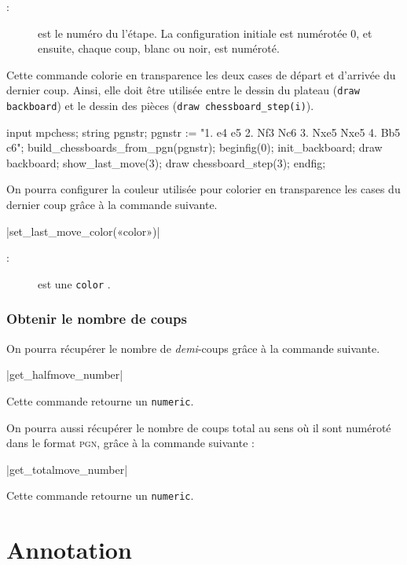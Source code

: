 \documentclass[french]{ltxdoc}
\begin{document}
\begin{description}
\item[:] est le numéro du l’étape. La configuration initiale est numérotée 0, et ensuite, chaque coup, blanc ou noir, est numéroté.
\end{description}

Cette commande colorie en transparence les deux cases de départ et d’arrivée du dernier coup. Ainsi, elle doit être utilisée entre le dessin du plateau (\lstinline+draw backboard+) et le dessin des pièces (\lstinline+draw chessboard_step(i)+).

\begin{ExempleMP}
input mpchess;
string pgnstr;
pgnstr := "1. e4 e5 2. Nf3 Nc6 3. Nxe5 Nxe5 4. Bb5 c6";
build_chessboards_from_pgn(pgnstr);
beginfig(0);
init_backboard;
draw backboard;
show_last_move(3);
draw chessboard_step(3); %
endfig;
\end{ExempleMP}

On pourra configurer la couleur utilisée pour colorier en transparence les cases du dernier coup grâce à la commande suivante.

\commande|set_last_move_color(«color»)|\smallskip
\begin{description}
  \item[:] est une \lstinline+color+ \MP.
\end{description}



\subsubsection{Obtenir le nombre de coups}

On pourra récupérer le nombre de \emph{demi}-coups grâce à la
commande suivante.

\commande|get_halfmove_number|\smallskip

Cette commande retourne un \lstinline+numeric+.

On pourra aussi récupérer le nombre de coups \og{}total\fg{} au sens où il sont numéroté dans le format \textsc{pgn}, grâce à la commande suivante :

\commande|get_totalmove_number|\smallskip

Cette commande retourne un \lstinline+numeric+.

\section{Annotation}
\end{document}
